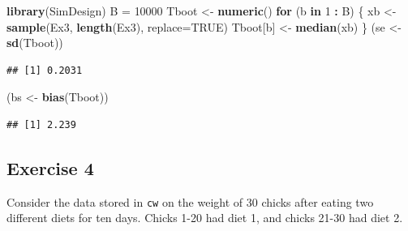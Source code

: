 \documentclass[
]{article}
\newenvironment{Shaded}{\begin{snugshade}}{\end{snugshade}}
\newcommand{\ControlFlowTok}[1]{\textcolor[rgb]{0.13,0.29,0.53}{\textbf{#1}}}
\newcommand{\DataTypeTok}[1]{\textcolor[rgb]{0.13,0.29,0.53}{#1}}
\newcommand{\DecValTok}[1]{\textcolor[rgb]{0.00,0.00,0.81}{#1}}
\newcommand{\KeywordTok}[1]{\textcolor[rgb]{0.13,0.29,0.53}{\textbf{#1}}}
\newcommand{\NormalTok}[1]{#1}
\newcommand{\OperatorTok}[1]{\textcolor[rgb]{0.81,0.36,0.00}{\textbf{#1}}}
\newcommand{\OtherTok}[1]{\textcolor[rgb]{0.56,0.35,0.01}{#1}}
\newcommand{\StringTok}[1]{\textcolor[rgb]{0.31,0.60,0.02}{#1}}
\begin{document}
\begin{Shaded}
\begin{Highlighting}[]
\KeywordTok{library}\NormalTok{(SimDesign)}
\NormalTok{B =}\StringTok{ }\DecValTok{10000}
\NormalTok{Tboot <-}\StringTok{ }\KeywordTok{numeric}\NormalTok{()}
\ControlFlowTok{for}\NormalTok{ (b }\ControlFlowTok{in} \DecValTok{1} \OperatorTok{:}\StringTok{ }\NormalTok{B) \{}
\NormalTok{  xb <-}\StringTok{ }\KeywordTok{sample}\NormalTok{(Ex3, }\KeywordTok{length}\NormalTok{(Ex3), }\DataTypeTok{replace=}\OtherTok{TRUE}\NormalTok{)}
\NormalTok{  Tboot[b] <-}\StringTok{ }\KeywordTok{median}\NormalTok{(xb)}
\NormalTok{\}}
\NormalTok{(se <-}\StringTok{ }\KeywordTok{sd}\NormalTok{(Tboot))}
\end{Highlighting}
\end{Shaded}

\begin{verbatim}
## [1] 0.2031
\end{verbatim}

\begin{Shaded}
\begin{Highlighting}[]
\NormalTok{(bs <-}\StringTok{ }\KeywordTok{bias}\NormalTok{(Tboot))}
\end{Highlighting}
\end{Shaded}

\begin{verbatim}
## [1] 2.239
\end{verbatim}

\hypertarget{exercise-4}{%
\subsection{Exercise 4}\label{exercise-4}}

Consider the data stored in \texttt{cw} on the weight of 30 chicks after
eating two different diets for ten days. Chicks 1-20 had diet 1, and
chicks 21-30 had diet 2.

\begin{Shaded}
\end{Shaded}
\end{document}

